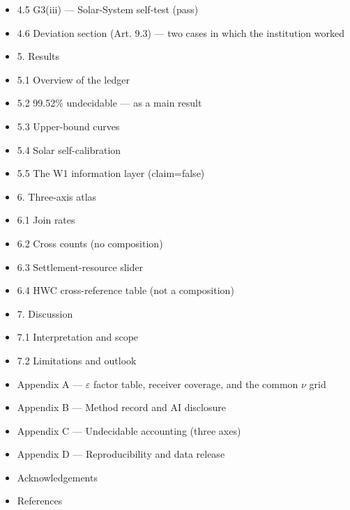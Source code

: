 \documentclass[11pt]{article}
\begin{document}
\begin{itemize}
\item[] \hspace{1.2em}4.5 G3(iii) --- Solar-System self-test (pass)
\item[] \hspace{1.2em}4.6 Deviation section (Art. 9.3) --- two cases in which the institution worked
\item[] 5. Results
\item[] \hspace{1.2em}5.1 Overview of the ledger
\item[] \hspace{1.2em}5.2 99.52\% undecidable --- as a main result
\item[] \hspace{1.2em}5.3 Upper-bound curves
\item[] \hspace{1.2em}5.4 Solar self-calibration
\item[] \hspace{1.2em}5.5 The W1 information layer (claim=false)
\item[] 6. Three-axis atlas
\item[] \hspace{1.2em}6.1 Join rates
\item[] \hspace{1.2em}6.2 Cross counts (no composition)
\item[] \hspace{1.2em}6.3 Settlement-resource slider
\item[] \hspace{1.2em}6.4 HWC cross-reference table (not a composition)
\item[] 7. Discussion
\item[] \hspace{1.2em}7.1 Interpretation and scope
\item[] \hspace{1.2em}7.2 Limitations and outlook
\item[] Appendix A --- \(\varepsilon\) factor table, receiver coverage, and the common \(\nu\) grid
\item[] Appendix B --- Method record and AI disclosure
\item[] Appendix C --- Undecidable accounting (three axes)
\item[] Appendix D --- Reproducibility and data release
\item[] Acknowledgements
\item[] References
\end{itemize}
\end{document}
